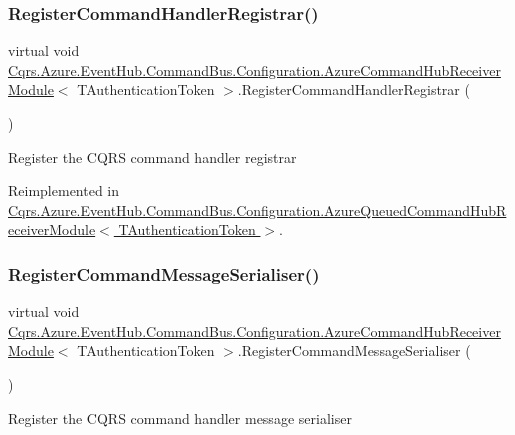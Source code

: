 \subsubsection{\texorpdfstring{Register\+Command\+Handler\+Registrar()}{RegisterCommandHandlerRegistrar()}}
{\footnotesize\ttfamily virtual void \hyperlink{classCqrs_1_1Azure_1_1EventHub_1_1CommandBus_1_1Configuration_1_1AzureCommandHubReceiverModule}{Cqrs.\+Azure.\+Event\+Hub.\+Command\+Bus.\+Configuration.\+Azure\+Command\+Hub\+Receiver\+Module}$<$ T\+Authentication\+Token $>$.Register\+Command\+Handler\+Registrar (\begin{DoxyParamCaption}{ }\end{DoxyParamCaption})\hspace{0.3cm}{\ttfamily [virtual]}}



Register the C\+Q\+RS command handler registrar 



Reimplemented in \hyperlink{classCqrs_1_1Azure_1_1EventHub_1_1CommandBus_1_1Configuration_1_1AzureQueuedCommandHubReceiverModule_a2513051554179e7d2a4d800375300b53_a2513051554179e7d2a4d800375300b53}{Cqrs.\+Azure.\+Event\+Hub.\+Command\+Bus.\+Configuration.\+Azure\+Queued\+Command\+Hub\+Receiver\+Module$<$ T\+Authentication\+Token $>$}.

\mbox{\label{classCqrs_1_1Azure_1_1EventHub_1_1CommandBus_1_1Configuration_1_1AzureCommandHubReceiverModule_a980e8c541dc2423c9c09aa51753a6d82_a980e8c541dc2423c9c09aa51753a6d82}} 
\subsubsection{\texorpdfstring{Register\+Command\+Message\+Serialiser()}{RegisterCommandMessageSerialiser()}}
{\footnotesize\ttfamily virtual void \hyperlink{classCqrs_1_1Azure_1_1EventHub_1_1CommandBus_1_1Configuration_1_1AzureCommandHubReceiverModule}{Cqrs.\+Azure.\+Event\+Hub.\+Command\+Bus.\+Configuration.\+Azure\+Command\+Hub\+Receiver\+Module}$<$ T\+Authentication\+Token $>$.Register\+Command\+Message\+Serialiser (\begin{DoxyParamCaption}{ }\end{DoxyParamCaption})\hspace{0.3cm}{\ttfamily [virtual]}}



Register the C\+Q\+RS command handler message serialiser 

